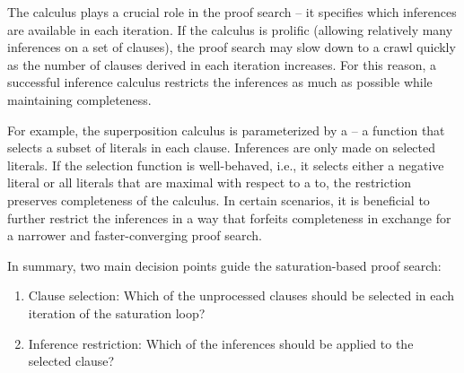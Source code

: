 The calculus plays a crucial role in the proof search -- it specifies which inferences are available in each iteration.
If the calculus is prolific (allowing relatively many inferences on a set of clauses), the proof search may slow down to a crawl quickly as the number of clauses derived in each iteration increases.
For this reason, a successful inference calculus restricts the inferences as much as possible while maintaining completeness.

For example, the superposition calculus \cite{DBLP:journals/logcom/BachmairG94}
is parameterized by a  -- a function that selects a subset of literals in each clause.
Inferences are only made on selected literals.
If the selection function is well-behaved,
i.e., it selects either a negative literal or all literals that are maximal with respect to a \gls{to},
the restriction preserves completeness of the calculus.
In certain scenarios, it is beneficial to further restrict the inferences in a way that forfeits completeness
in exchange for a narrower and faster-converging proof search.



In summary, two main decision points guide the \gls{saturation}-based proof search:
\begin{enumerate}
\item Clause selection: Which of the unprocessed clauses should be selected in each iteration of the saturation loop?
\item Inference restriction: Which of the inferences should be applied to the selected clause?
\end{enumerate}

